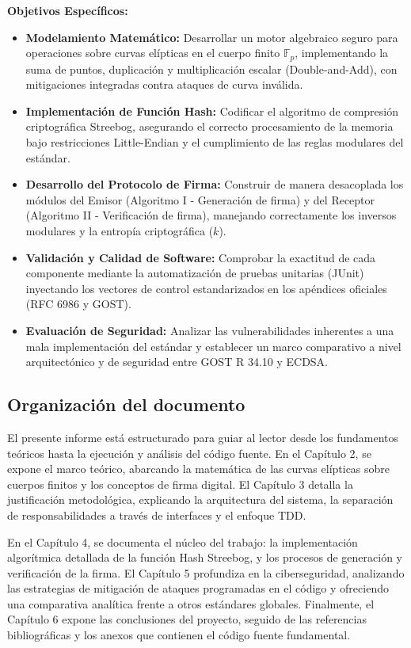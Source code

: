 \vspace{0.3cm}
\noindent\textbf{Objetivos Específicos:}
\begin{itemize}
    \item \textbf{Modelamiento Matemático:} Desarrollar un motor algebraico seguro para operaciones sobre curvas elípticas en el cuerpo finito $\mathbb{F}_p$, implementando la suma de puntos, duplicación y multiplicación escalar (Double-and-Add), con mitigaciones integradas contra ataques de curva inválida.
    \item \textbf{Implementación de Función Hash:} Codificar el algoritmo de compresión criptográfica Streebog, asegurando el correcto procesamiento de la memoria bajo restricciones Little-Endian y el cumplimiento de las reglas modulares del estándar.
    \item \textbf{Desarrollo del Protocolo de Firma:} Construir de manera desacoplada los módulos del Emisor (Algoritmo I - Generación de firma) y del Receptor (Algoritmo II - Verificación de firma), manejando correctamente los inversos modulares y la entropía criptográfica ($k$).
    \item \textbf{Validación y Calidad de Software:} Comprobar la exactitud de cada componente mediante la automatización de pruebas unitarias (JUnit) inyectando los vectores de control estandarizados en los apéndices oficiales (RFC 6986 y GOST).
    \item \textbf{Evaluación de Seguridad:} Analizar las vulnerabilidades inherentes a una mala implementación del estándar y establecer un marco comparativo a nivel arquitectónico y de seguridad entre GOST R 34.10 y ECDSA.
\end{itemize}

\subsection{Organización del documento}
El presente informe está estructurado para guiar al lector desde los fundamentos teóricos hasta la ejecución y análisis del código fuente. En el Capítulo 2, se expone el marco teórico, abarcando la matemática de las curvas elípticas sobre cuerpos finitos y los conceptos de firma digital. El Capítulo 3 detalla la justificación metodológica, explicando la arquitectura del sistema, la separación de responsabilidades a través de interfaces y el enfoque TDD.

En el Capítulo 4, se documenta el núcleo del trabajo: la implementación algorítmica detallada de la función Hash Streebog, y los procesos de generación y verificación de la firma. El Capítulo 5 profundiza en la ciberseguridad, analizando las estrategias de mitigación de ataques programadas en el código y ofreciendo una comparativa analítica frente a otros estándares globales. Finalmente, el Capítulo 6 expone las conclusiones del proyecto, seguido de las referencias bibliográficas y los anexos que contienen el código fuente fundamental.